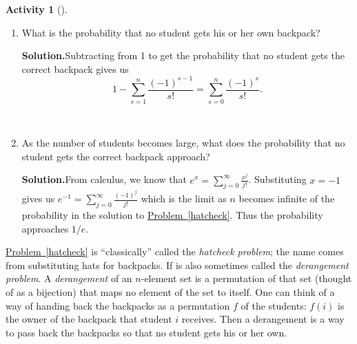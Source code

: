 \documentclass[10pt,]{book}
\theoremstyle{plain}
\theoremstyle{definition}
\newtheorem{activity}[project]{Activity}
\numberwithin{equation}{chapter}
\begin{document}
\begin{activity}[]
\begin{enumerate}[label=(\alph*)]
~\par
\item What is the probability that no student gets his or her own backpack?%
\par\medskip\noindent%
\textbf{Solution.}\quad Subtracting from 1 to get the probability that no student gets the correct backpack gives us%
\begin{equation*}
1-\sum_{s=1}^n  \frac{(-1)^{s-1}}{s!} = \sum_{s=0}^n \frac{(-1)^s}{s!}.
\end{equation*}
%

~\par
\item As the number of students becomes large, what does the probability that no student gets the correct backpack approach?%
\par\medskip\noindent%
\textbf{Solution.}\quad From calculus, we know that \(e^x=\sum_{j=0}^\infty \frac{x^j}{j!}\). Substituting \(x=-1\) gives us \(e^{-1}=\sum_{j=0}^\infty
\frac{(-1)^j}{j!}\) which is the limit as \(n\) becomes infinite of the probability in the solution to \hyperref[hatcheck]{Problem~\ref{hatcheck}}. Thus the probability approaches \(1/e\).%

\end{enumerate}
\end{activity}
\hyperref[hatcheck]{Problem~\ref{hatcheck}} is ``classically'' called the \emph{hatcheck problem}; the name comes from substituting hats for backpacks. If is also sometimes called the \emph{derangement problem}. A \emph{derangement} of an \(n\)-element set is a permutation of that set (thought of as a bijection) that maps no element of the set to itself. One can think of a way of handing back the backpacks as a permutation \(f\) of the students: \(f(i)\) is the owner of the backpack that student \(i\) receives. Then a derangement is a way to pass back the backpacks so that no student gets his or her own.%
\typeout{************************************************}
\typeout{************************************************}
\end{document}
